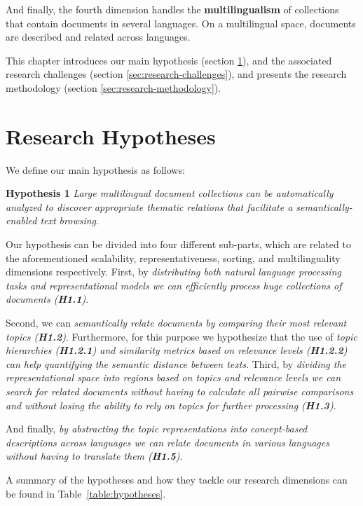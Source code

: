 And finally, the fourth dimension handles the \textbf{multilingualism} of collections that contain documents in several languages. On a multilingual space, documents are described and related across languages.

This chapter introduces our main hypothesis (section \ref{sec:research-hypothesis}), and the associated research challenges (section \ref{sec:research-challenges}), and presents the research methodology (section \ref{sec:research-methodology}).

\section{Research Hypotheses}\label{sec:research-hypothesis}

We define our main hypothesis as follows:

\textbf{Hypothesis 1} \textit{Large multilingual document collections can be automatically analyzed to discover appropriate thematic relations that facilitate a semantically-enabled text browsing}.

Our hypothesis can be divided into four different sub-parts, which are related to the aforementioned scalability, representativeness, sorting, and multilinguality dimensions respectively. First, by \textit{distributing both natural language processing tasks and representational models we can efficiently process huge collections of documents (\textbf{H1.1})}.

Second, we can \textit{semantically relate documents by comparing their most relevant topics (\textbf{H1.2})}. Furthermore, for this purpose we hypothesize that the use of \textit{topic hierarchies (\textbf{H1.2.1}) and similarity metrics based on relevance levels (\textbf{H1.2.2}) can help quantifying the semantic distance between texts}. Third, by \textit{dividing the representational space into regions based on topics and relevance levels we can search for related documents without having to calculate all pairwise comparisons and without losing the ability to rely on topics for further processing (\textbf{H1.3})}.

And finally, \textit{by abstracting the topic representations into concept-based descriptions across languages we can relate documents in various languages without having to translate them (\textbf{H1.5})}.

A summary of the hypotheses and how they tackle our research dimensions can be found in Table~\ref{table:hypotheses}.

